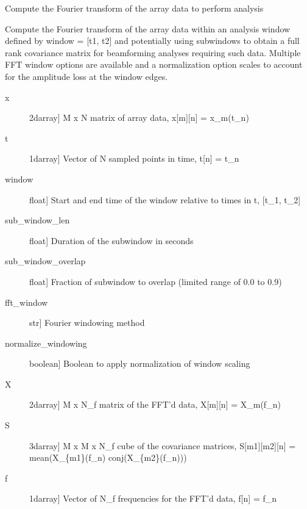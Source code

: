 \documentclass[letterpaper,10pt,english]{sphinxmanual}
\begin{document}
\begin{fulllineitems}
\label{\detokenize{infrapy.detection:infrapy.detection.beamforming_new.fft_array_data}}
Compute the Fourier transform of the array data to perform analysis

Compute the Fourier transform of the array data within an analysis window defined by window = {[}t1, t2{]}
and potentially using subwindows to obtain a full rank covariance matrix for beamforming analyses
requiring such data.  Multiple FFT window options are available and a normalization option scales to
account for the amplitude loss at the window edges.
\begin{description}
\item[{x}] \leavevmode{[}2darray{]}
M x N matrix of array data, x{[}m{]}{[}n{]} = x\_m(t\_n)

\item[{t}] \leavevmode{[}1darray{]}
Vector of N sampled points in time, t{[}n{]} = t\_n

\item[{window}] \leavevmode{[}float{]}
Start and end time of the window relative to times in t, {[}t\_1, t\_2{]}

\item[{sub\_window\_len}] \leavevmode{[}float{]}
Duration of the subwindow in seconds

\item[{sub\_window\_overlap}] \leavevmode{[}float{]}
Fraction of subwindow to overlap (limited range of 0.0 to 0.9)

\item[{fft\_window}] \leavevmode{[}str{]}
Fourier windowing method

\item[{normalize\_windowing}] \leavevmode{[}boolean{]}
Boolean to apply normalization of window scaling

\end{description}
\begin{description}
\item[{X}] \leavevmode{[}2darray{]}
M x N\_f matrix of the FFT’d data, X{[}m{]}{[}n{]} = X\_m(f\_n)

\item[{S}] \leavevmode{[}3darray{]}
M x M x N\_f cube of the covariance matrices, S{[}m1{]}{[}m2{]}{[}n{]} = mean(X\_\{m1\}(f\_n) conj(X\_\{m2\}(f\_n)))

\item[{f}] \leavevmode{[}1darray{]}
Vector of N\_f frequencies for the FFT’d data, f{[}n{]} = f\_n

\end{description}

\end{fulllineitems}
\end{document}
